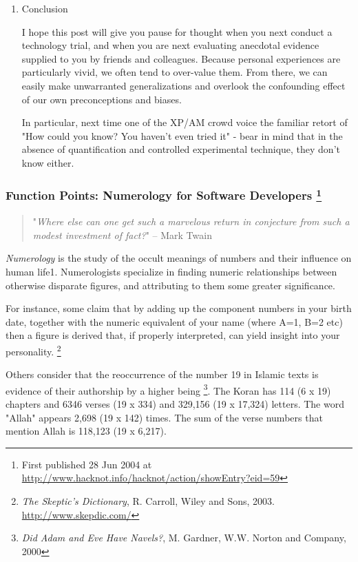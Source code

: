 \documentclass{article}
\begin{document}
\begin{enumerate}
\item Conclusion
\label{sec:orgheadline378}

I hope this post will give you pause for thought when you next conduct a
technology trial, and when you are next evaluating anecdotal evidence
supplied to you by friends and colleagues. Because personal experiences
are particularly vivid, we often tend to over-value them. From there, we
can easily make unwarranted generalizations and overlook the confounding
effect of our own preconceptions and biases.

In particular, next time one of the XP/AM crowd voice the familiar
retort of "How could you know? You haven't even tried it" - bear in mind
that in the absence of quantification and controlled experimental
technique, they don't know either.
\end{enumerate}

\subsubsection{Function Points: Numerology for Software Developers \footnote{First published 28 Jun 2004 at
\url{http://www.hacknot.info/hacknot/action/showEntry?eid=59}}}
\label{sec:orgheadline167}
\begin{quote}
"\emph{Where else can one get such a marvelous return in conjecture from
such a modest investment of fact?}" -- Mark Twain
\end{quote}

\emph{Numerology} is the study of the occult meanings of numbers and their
influence on human life1. Numerologists specialize in finding numeric
relationships between otherwise disparate figures, and attributing to
them some greater significance.

For instance, some claim that by adding up the component numbers in your
birth date, together with the numeric equivalent of your name (where
A=1, B=2 etc) then a figure is derived that, if properly interpreted,
can yield insight into your personality. \footnote{\emph{The Skeptic's Dictionary}, R. Carroll, Wiley and Sons, 2003.
\url{http://www.skepdic.com/}}

Others consider that the reoccurrence of the number 19 in Islamic texts
is evidence of their authorship by a higher being \footnote{\emph{Did Adam and Eve Have Navels?}, M. Gardner, W.W. Norton and
Company, 2000}. The Koran has
114 (6 x 19) chapters and 6346 verses (19 x 334) and 329,156 (19 x
17,324) letters. The word "Allah" appears 2,698 (19 x 142) times. The
sum of the verse numbers that mention Allah is 118,123 (19 x 6,217).
\end{document}
